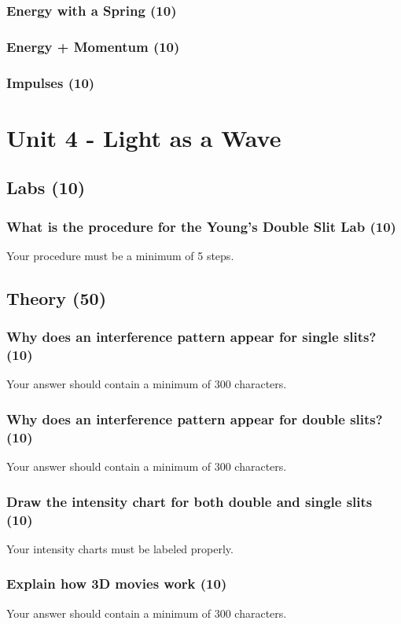 \documentclass{article}
\begin{document}
\subsubsection{Energy with a Spring (10)}
\subsubsection{Energy + Momentum (10)}
\subsubsection{Impulses (10)}



\section{Unit 4 - Light as a Wave}
\subsection{Labs (10)}
\subsubsection{What is the procedure for the Young's Double Slit Lab (10)}
Your procedure must be a minimum of 5 steps.

\subsection{Theory (50)}
\subsubsection{Why does an interference pattern appear for single slits? (10)}
Your answer should contain a minimum of 300 characters.

\subsubsection{Why does an interference pattern appear for double slits? (10)}
Your answer should contain a minimum of 300 characters.

\subsubsection{Draw the intensity chart for both double and single slits (10)}
Your intensity charts must be labeled properly.

\subsubsection{Explain how 3D movies work (10)}
Your answer should contain a minimum of 300 characters.
\end{document}
